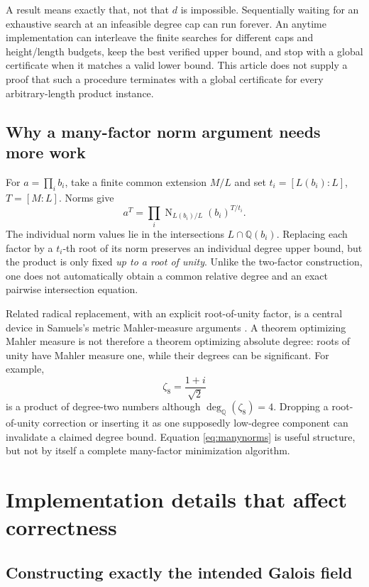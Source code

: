 \documentclass[11pt,a4paper]{article}
\theoremstyle{definition}\newtheorem{definition}[theorem]{Definition}
\theoremstyle{remark}\newtheorem{remark}[theorem]{Remark}
\newcommand{\Q}{\mathbb Q}
\newcommand{\Nm}{\operatorname{N}}
\newcommand{\dega}{\operatorname{deg}_{\Q}}
\newcommand{\code}[1]{\texttt{\detokenize{#1}}}
\begin{document}
A result \code{NotFoundWithinBounds} means exactly that, not that $d$ is
impossible. Sequentially waiting for an exhaustive search at an infeasible
degree cap can run forever. An anytime implementation can interleave the
finite searches for different caps and height/length budgets, keep the best
verified upper bound, and stop with a global certificate when it matches a
valid lower bound. This article does not supply a proof that such a
procedure terminates with a global certificate for every arbitrary-length
product instance.

\subsection{Why a many-factor norm argument needs more work}

For $a=\prod_i b_i$, take a finite common extension $M/L$ and set
$t_i=[L(b_i):L]$, $T=[M:L]$. Norms give
\begin{equation}
 a^T=\prod_i\Nm_{L(b_i)/L}(b_i)^{T/t_i}.
 \label{eq:manynorms}
\end{equation}
The individual norm values lie in the intersections
$L\cap\Q(b_i)$. Replacing each factor by a $t_i$-th root of its norm
preserves an individual degree upper bound, but the product is only fixed
\emph{up to a root of unity}. Unlike the two-factor construction, one does
not automatically obtain a common relative degree and an exact pairwise
intersection equation.

Related radical replacement, with an explicit root-of-unity factor, is a
central device in Samuels's metric Mahler-measure arguments
\cite[Theorem 2.1]{samuels}. A theorem optimizing Mahler measure is not
therefore a theorem optimizing absolute degree: roots of unity have Mahler
measure one, while their degrees can be significant. For example,
\[
 \zeta_8=\frac{1+i}{\sqrt2}
\]
is a product of degree-two numbers although $\dega(\zeta_8)=4$.
Dropping a root-of-unity correction or inserting it as one supposedly
low-degree component can invalidate a claimed degree bound. Equation
\eqref{eq:manynorms} is useful structure, but not by itself a complete
many-factor minimization algorithm.

\section{Implementation details that affect correctness}
\label{sec:implementation}

\subsection{Constructing exactly the intended Galois field}
\end{document}
